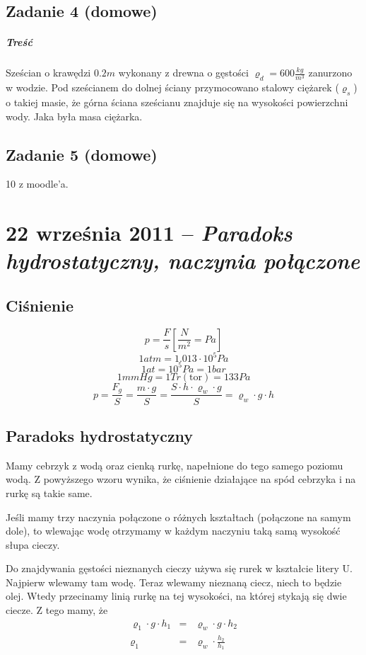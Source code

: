 \documentclass [a4paper, 11pt, oneside]{book}
\begin{document}
	\section{Zadanie 4 (domowe)} %
	\label{sec:zadanie_4}
		\paragraph{Treść}Sześcian o krawędzi $0.2m$ wykonany z drewna o gęstości $\varrho_d = 600\frac{kg}{m^3}$ zanurzono w wodzie. Pod sześcianem do dolnej ściany przymocowano stalowy ciężarek ($\varrho_s$) o takiej masie, że górna ściana sześcianu znajduje się na wysokości powierzchni wody. Jaka była masa ciężarka.
	\section{Zadanie 5 (domowe)} %
	\label{sec:zadanie_5_}
		10 z moodle'a.
\chapter{22 września 2011 -- \textit{Paradoks hydrostatyczny, naczynia połączone}} %
\label{cha:22_wrze_nia_2011_textit}
	\section{Ciśnienie} %
	\label{sec:ci_nienie}
		\[
			p = \frac{F}{s} \left[\frac{N}{m^2} = Pa\right]
		\]
		\[
			1atm = 1.013\cdot 10^5Pa
		\]
		\[
			1at = 10^5Pa = 1bar
		\]
		\[
			1mmHg = 1 Tr \mathrm{(tor)} = 133 Pa
		\]
		\[
			p = \frac{F_g}{S} = \frac{m\cdot g}{S} = \frac{S\cdot h\cdot \varrho_w\cdot g}{S} = \varrho_w\cdot g\cdot h
		\]
	\section{Paradoks hydrostatyczny} %
	\label{sec:paradoks_hydrostatyczny}
		Mamy cebrzyk z wodą oraz cienką rurkę, napełnione do tego samego poziomu wodą. Z powyższego wzoru wynika, że ciśnienie działające na spód cebrzyka i na rurkę są takie same.

		Jeśli mamy trzy naczynia połączone o różnych kształtach (połączone na samym dole), to wlewając wodę otrzymamy w każdym naczyniu taką samą wysokość słupa cieczy.

		Do znajdywania gęstości nieznanych cieczy używa się rurek w kształcie litery U. Najpierw wlewamy tam wodę. Teraz wlewamy nieznaną ciecz, niech to będzie olej. Wtedy przecinamy linią rurkę na tej wysokości, na której stykają się dwie ciecze. Z tego mamy, że
		\begin{eqnarray*}
			\varrho_1\cdot g\cdot h_1 &=& \varrho_w\cdot g\cdot h_2\\
			\varrho_1 &=& \varrho_w\cdot\frac{h_2}{h_1}
		\end{eqnarray*}
\end{document}
